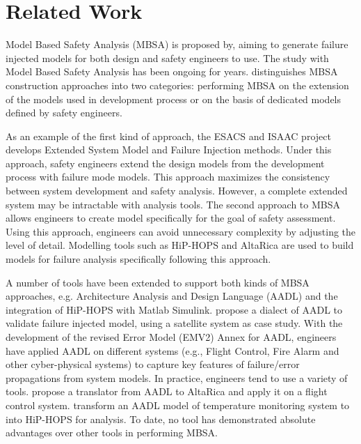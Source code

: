 \section{Related Work}
Model Based Safety Analysis (MBSA) is proposed by\cite{mbsa05}, aiming to generate failure injected models for both design and safety engineers to use. The study with Model Based Safety Analysis has been ongoing for years. \cite{mbsa11} distinguishes MBSA construction approaches into two categories: performing MBSA on the extension of the models used in development process or on the basis of dedicated models defined by safety engineers.

As an example of the first kind of approach, the ESACS and ISAAC project develops Extended System Model and Failure Injection methods\cite{erts06,esrel03}. Under this approach, safety engineers extend the design models from the development process with failure mode models. This approach maximizes the consistency between system development and safety analysis. However, a complete extended system may be intractable with analysis tools. The second approach to MBSA allows engineers to create model specifically for the goal of safety assessment. Using this approach, engineers can avoid unnecessary complexity by adjusting the level of detail. Modelling tools such as HiP-HOPS and AltaRica are used to build models for failure analysis specifically following this approach. 



A number of tools have been extended to support both kinds of MBSA approaches, e.g. Architecture Analysis and Design Language (AADL)\cite{cmu07,sae11} and the integration of HiP-HOPS with Matlab Simulink\cite{dsn01}. \cite{aadl13} propose a dialect of AADL to validate failure injected model, using a satellite system as case study. With the development of the revised Error Model (EMV2) Annex\cite{aadlemv2} for AADL, engineers have applied AADL on different systems (e.g., Flight Control\cite{field1}, Fire Alarm\cite{field2} and other cyber-physical systems\cite{field3}) to capture key features of failure/error propagations from system models. In practice, engineers tend to use a variety of tools. \cite{aadl_altarica} propose a translator from AADL to AltaRica and apply it on a flight control system.\cite{aadl_hiphop} transform an AADL model of temperature monitoring system to into HiP-HOPS for analysis. To date, no tool has demonstrated absolute advantages over other tools in performing MBSA.
